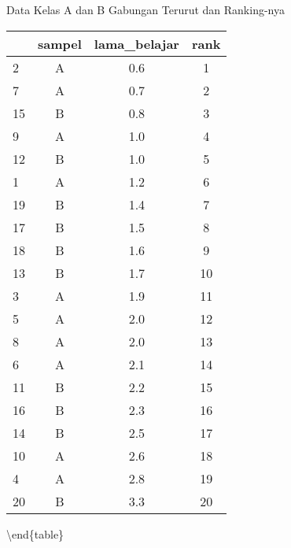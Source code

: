 \documentclass[
]{book}
\begin{document}
\caption{\label{tab:unnamed-chunk-13}Data Kelas A dan B Gabungan Terurut dan Ranking-nya}
\centering
\begin{tabular}[t]{l|c|c|c}
\hline
  & sampel & lama\_belajar & rank\\
\hline
2 & A & 0.6 & 1\\
\hline
7 & A & 0.7 & 2\\
\hline
15 & B & 0.8 & 3\\
\hline
9 & A & 1.0 & 4\\
\hline
12 & B & 1.0 & 5\\
\hline
1 & A & 1.2 & 6\\
\hline
19 & B & 1.4 & 7\\
\hline
17 & B & 1.5 & 8\\
\hline
18 & B & 1.6 & 9\\
\hline
13 & B & 1.7 & 10\\
\hline
3 & A & 1.9 & 11\\
\hline
5 & A & 2.0 & 12\\
\hline
8 & A & 2.0 & 13\\
\hline
6 & A & 2.1 & 14\\
\hline
11 & B & 2.2 & 15\\
\hline
16 & B & 2.3 & 16\\
\hline
14 & B & 2.5 & 17\\
\hline
10 & A & 2.6 & 18\\
\hline
4 & A & 2.8 & 19\\
\hline
20 & B & 3.3 & 20\\
\hline
\end{tabular}

\textbackslash end\{table\}
\end{document}
